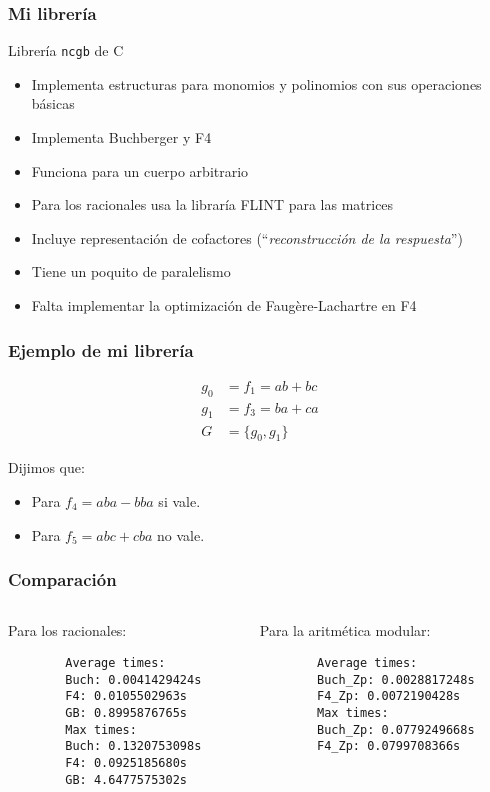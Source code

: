 \documentclass[spanish, aspectratio=169, hidecontrols]{beamer}
\newcommand\cpp{C\nolinebreak[4]\hspace{-.05em}\raisebox{.4ex}{\relsize{-3}{\textbf{++}}}\xspace}
\begin{document}
\begin{frame}
  \frametitle{Mi librería}
  Librería \texttt{ncgb} de \cpp
  \pause
  \begin{itemize}
    \item Implementa estructuras para monomios y polinomios con sus operaciones básicas
    \pause
    \item Implementa Buchberger y F4
    \pause
    \item Funciona para un \alert{cuerpo arbitrario}
    \pause
    \item Para los racionales usa la libraría FLINT para las matrices
    \pause
    \item Incluye \alert{representación de cofactores} (``\textit{reconstrucción de la respuesta}'')
    \pause
    \item Tiene un poquito de paralelismo
    \pause
    \item Falta implementar la optimización de Faugère-Lachartre en F4
  \end{itemize}
\end{frame}

\begin{frame}
  \frametitle{Ejemplo de mi librería}
  \begin{align*}
    g_0 &= f_1 = ab + bc \\
    g_1 &= f_3 = ba + ca \\
    G &= \{g_0, g_1\}
  \end{align*}

  Dijimos que:
  \begin{itemize}
    \item Para $f_4 = aba - bba$ si vale.
    \item Para $f_5 = abc + cba$ no vale.
  \end{itemize}
\end{frame}

\begin{frame}[fragile]
  \frametitle{Comparación}
  \begin{columns}
    \begin{column}{0.5\textwidth}
      Para los racionales:
      \begin{verbatim}
        Average times:
        Buch: 0.0041429424s
        F4: 0.0105502963s
        GB: 0.8995876765s
        Max times:
        Buch: 0.1320753098s
        F4: 0.0925185680s
        GB: 4.6477575302s
      \end{verbatim}
    \end{column}
    \begin{column}{0.5\textwidth}
      Para la aritmética modular:
      \begin{verbatim}
        Average times:
        Buch_Zp: 0.0028817248s
        F4_Zp: 0.0072190428s
        Max times:
        Buch_Zp: 0.0779249668s
        F4_Zp: 0.0799708366s
      \end{verbatim}
    \end{column}
  \end{columns}
\end{frame}
\end{document}
